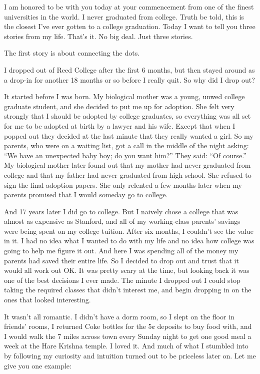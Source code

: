\documentclass{ltjsarticle}
\begin{document}
I am honored to be with you today at your commencement from one of the finest universities in the world. I never graduated from college. Truth be told, this is the closest I’ve ever gotten to a college graduation. Today I want to tell you three stories from my life. That’s it. No big deal. Just three stories.

The first story is about connecting the dots.

I dropped out of Reed College after the first 6 months, but then stayed around as a drop-in for another 18 months or so before I really quit. So why did I drop out?

It started before I was born. My biological mother was a young, unwed college graduate student, and she decided to put me up for adoption. She felt very strongly that I should be adopted by college graduates, so everything was all set for me to be adopted at birth by a lawyer and his wife. Except that when I popped out they decided at the last minute that they really wanted a girl. So my parents, who were on a waiting list, got a call in the middle of the night asking: “We have an unexpected baby boy; do you want him?” They said: “Of course.” My biological mother later found out that my mother had never graduated from college and that my father had never graduated from high school. She refused to sign the final adoption papers. She only relented a few months later when my parents promised that I would someday go to college.

And 17 years later I did go to college. But I naively chose a college that was almost as expensive as Stanford, and all of my working-class parents’ savings were being spent on my college tuition. After six months, I couldn’t see the value in it. I had no idea what I wanted to do with my life and no idea how college was going to help me figure it out. And here I was spending all of the money my parents had saved their entire life. So I decided to drop out and trust that it would all work out OK. It was pretty scary at the time, but looking back it was one of the best decisions I ever made. The minute I dropped out I could stop taking the required classes that didn’t interest me, and begin dropping in on the ones that looked interesting.

It wasn’t all romantic. I didn’t have a dorm room, so I slept on the floor in friends’ rooms, I returned Coke bottles for the 5¢ deposits to buy food with, and I would walk the 7 miles across town every Sunday night to get one good meal a week at the Hare Krishna temple. I loved it. And much of what I stumbled into by following my curiosity and intuition turned out to be priceless later on. Let me give you one example:
\end{document}
